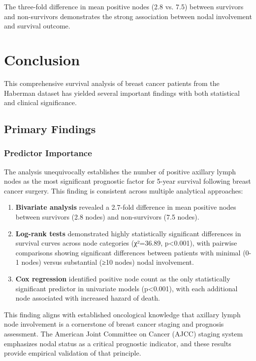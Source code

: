 \documentclass[12pt,a4paper]{article}
\begin{document}
The three-fold difference in mean positive nodes (2.8 vs. 7.5) between survivors and non-survivors demonstrates the strong association between nodal involvement and survival outcome.

\section{Conclusion}

This comprehensive survival analysis of breast cancer patients from the Haberman dataset has yielded several important findings with both statistical and clinical significance.

\subsection{Primary Findings}

\subsubsection{Predictor Importance}

The analysis unequivocally establishes the number of positive axillary lymph nodes as the most significant prognostic factor for 5-year survival following breast cancer surgery. This finding is consistent across multiple analytical approaches:

\begin{enumerate}
    \item \textbf{Bivariate analysis} revealed a 2.7-fold difference in mean positive nodes between survivors (2.8 nodes) and non-survivors (7.5 nodes).
    
    \item \textbf{Log-rank tests} demonstrated highly statistically significant differences in survival curves across node categories (χ²=36.89, p<0.001), with pairwise comparisons showing significant differences between patients with minimal (0-1 nodes) versus substantial (≥10 nodes) nodal involvement.
    
    \item \textbf{Cox regression} identified positive node count as the only statistically significant predictor in univariate models (p<0.001), with each additional node associated with increased hazard of death.
\end{enumerate}

This finding aligns with established oncological knowledge that axillary lymph node involvement is a cornerstone of breast cancer staging and prognosis assessment. The American Joint Committee on Cancer (AJCC) staging system emphasizes nodal status as a critical prognostic indicator, and these results provide empirical validation of that principle.
\end{document}
